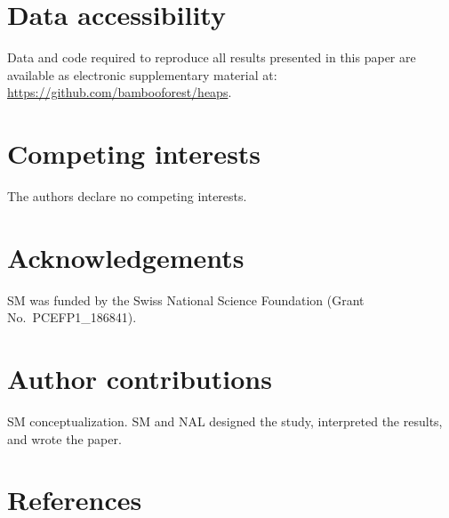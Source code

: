 \documentclass[
]{article}
\begin{document}
\hypertarget{data-accessibility}{%
\section{Data accessibility}\label{data-accessibility}}

Data and code required to reproduce all results presented in this paper
are available as electronic supplementary material at:
\url{https://github.com/bambooforest/heaps}.

\hypertarget{competing-interests}{%
\section{Competing interests}\label{competing-interests}}

The authors declare no competing interests.

\hypertarget{acknowledgements}{%
\section{Acknowledgements}\label{acknowledgements}}

SM was funded by the Swiss National Science Foundation (Grant
No.~PCEFP1\_186841).

\hypertarget{author-contributions}{%
\section{Author contributions}\label{author-contributions}}

SM conceptualization. SM and NAL designed the study, interpreted the
results, and wrote the paper.

\hypertarget{references}{%
\section*{References}\label{references}}
\end{document}
